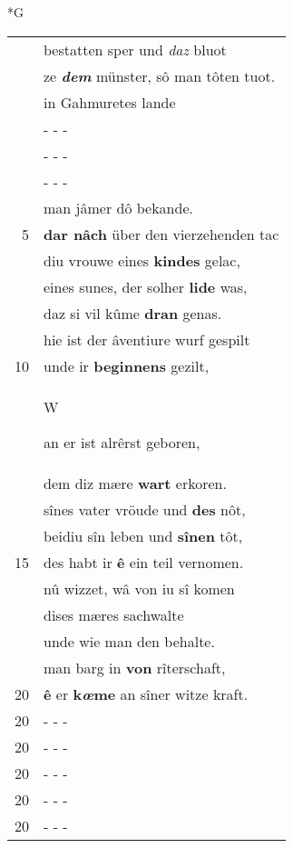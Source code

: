 \documentclass[8pt,a4paper,notitlepage]{article}
\begin{document}
\begin{table}[ht]
\begin{minipage}[t]{0.5\linewidth}
\small
\begin{center}*G
\end{center}
\begin{tabular}{rl}
 & bestatten sper und \textit{daz} bluot\\ 
 & ze \textit{\textbf{dem}} münster, sô man tôten tuot.\\ 
 & in Gahmuretes lande\\ 
 & \multicolumn{1}{l}{ - - - }\\ 
 & \multicolumn{1}{l}{ - - - }\\ 
 & \multicolumn{1}{l}{ - - - }\\ 
 & man jâmer dô bekande.\\ 
5 & \textbf{dar nâch} über den vierzehenden tac\\ 
 & diu vrouwe eines \textbf{kindes} gelac,\\ 
 & eines sunes, der solher \textbf{lide} was,\\ 
 & daz si vil kûme \textbf{dran} genas.\\ 
 & hie ist der âventiure wurf gespilt\\ 
10 & unde ir \textbf{beginnens} gezilt,\\ 
 & \begin{large}W\end{large}an er ist alrêrst geboren,\\ 
 & dem diz mære \textbf{wart} erkoren.\\ 
 & sînes vater vröude und \textbf{des} nôt,\\ 
 & beidiu sîn leben und \textbf{sînen} tôt,\\ 
15 & des habt ir \textbf{ê} ein teil vernomen.\\ 
 & nû wizzet, wâ von iu sî komen\\ 
 & dises mæres sachwalte\\ 
 & unde wie man den behalte.\\ 
 & man barg in \textbf{von} rîterschaft,\\ 
20 & \textbf{ê} er \textbf{k\textit{œ}me} an sîner witze kraft.\\ 
20 & \multicolumn{1}{l}{ - - - }\\ 
20 & \multicolumn{1}{l}{ - - - }\\ 
20 & \multicolumn{1}{l}{ - - - }\\ 
20 & \multicolumn{1}{l}{ - - - }\\ 
20 & \multicolumn{1}{l}{ - - - }\\ 

\end{tabular}
\end{minipage}
\end{table}
\end{document}
